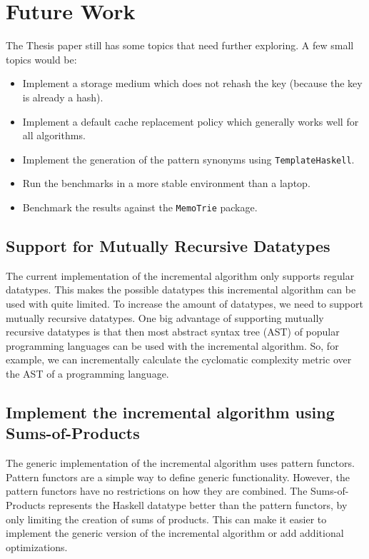 \section{Future Work}

The Thesis paper still has some topics that need further exploring. A few small topics would be: 
\begin{itemize}
  \item Implement a storage medium which does not rehash the key (because the key is already a hash).
  \item Implement a default cache replacement policy which generally works well for all algorithms. 
  \item Implement the generation of the pattern synonyms using \texttt{TemplateHaskell}.
  \item Run the benchmarks in a more stable environment than a laptop.
  \item Benchmark the results against the \texttt{MemoTrie} package.
\end{itemize}

\subsection{Support for Mutually Recursive Datatypes}
The current implementation of the incremental algorithm only supports regular datatypes. This makes the possible datatypes this incremental algorithm can be used with quite limited. To increase the amount of datatypes, we need to support mutually recursive datatypes. One big advantage of supporting mutually recursive datatypes is that then most abstract syntax tree (AST) of popular programming languages can be used with the incremental algorithm. So, for example, we can incrementally calculate the cyclomatic complexity metric over the AST of a programming language. 

\subsection{Implement the incremental algorithm using Sums-of-Products}
The generic implementation of the incremental algorithm uses pattern functors. Pattern functors are a simple way to define generic functionality. However, the pattern functors have no restrictions on how they are combined. The Sums-of-Products represents the Haskell datatype better than the pattern functors, by only limiting the creation of sums of products. This can make it easier to implement the generic version of the incremental algorithm or add additional optimizations.

